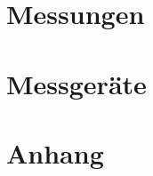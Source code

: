 \documentclass[a4paper,10pt,fleqn]{article}
\begin{document}





\section{Messungen}















\section{Messgeräte}




\clearpage
\section{Anhang}
\appendix

\end{document}
